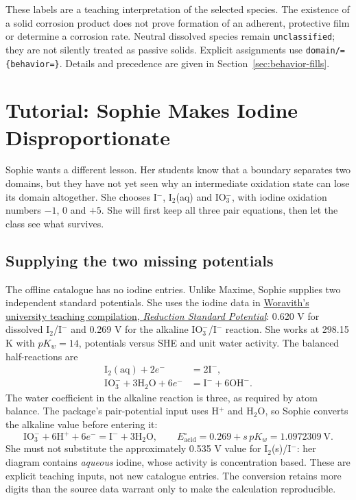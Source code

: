 \documentclass[a4paper,11pt]{ltxdoc}
\begin{document}
These labels are a teaching interpretation of the selected species. The existence
of a solid corrosion product does not prove formation of an adherent, protective
film or determine a corrosion rate. Neutral dissolved species remain
\texttt{unclassified}; they are not silently treated as passive solids.
Explicit assignments use \texttt{domain/=\{behavior=\}}.
Details and precedence are given in Section~\ref{sec:behavior-fills}.

\section{Tutorial: Sophie Makes Iodine Disproportionate}
\label{sec:tutorial-iodine}
Sophie wants a different lesson. Her students know that a boundary separates
two domains, but they have not yet seen why an intermediate oxidation state can
lose its domain altogether. She chooses I$^-$, I$_2$(aq) and IO$_3^-$, with iodine
oxidation numbers $-1$, $0$ and $+5$. She will first keep all three pair equations,
then let the class see what survives.

\subsection{Supplying the two missing potentials}
The offline catalogue has no iodine entries. Unlike Maxime, Sophie supplies two
independent standard potentials. She uses the iodine data in
\href{https://sci.rmutp.ac.th/woravith/?page_id=1786}{Woravith's university teaching
compilation, \emph{Reduction Standard Potential}}: 0.620 V for dissolved
I$_2$/I$^-$ and 0.269 V for the alkaline IO$_3^-$/I$^-$ reaction. She works at
298.15 K with $pK_w=14$, potentials versus SHE and unit water activity.
The balanced half-reactions are
\begin{align*}
 \mathrm{I_2(aq)}+2e^-&=2\mathrm{I^-},\\
 \mathrm{IO_3^-}+3\mathrm{H_2O}+6e^-&=
   \mathrm{I^-}+6\mathrm{OH^-}.
\end{align*}
The water coefficient in the alkaline reaction is three, as required by atom
balance. The package's pair-potential input uses H$^+$ and H$_2$O, so Sophie
converts the alkaline value before entering it:
\[
 \mathrm{IO_3^-}+6\mathrm{H^+}+6e^-=
 \mathrm{I^-}+3\mathrm{H_2O},\qquad
 E^\circ_{\mathrm{acid}}=0.269+s\,pK_w=1.0972309\ \mathrm V.
\]
She must not substitute the approximately 0.535 V value for I$_2$(s)/I$^-$:
her diagram contains \emph{aqueous} iodine, whose activity is concentration based.
These are explicit teaching inputs, not new catalogue entries. The conversion
retains more digits than the source data warrant only to make the calculation
reproducible.
\end{document}
